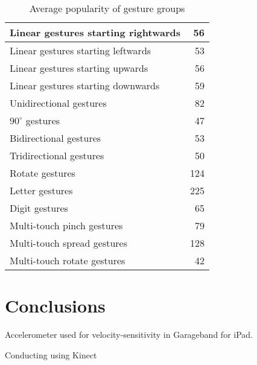 \documentclass{aes130}
\begin{document}
\begin{table} \label{tab:PrelimSurveyAverageGroups}
\begin{center}
\begin{tabular}{|l|r|} \hline

Linear gestures starting rightwards &  56 \\ \hline
Linear gestures starting leftwards  &  53 \\ \hline
Linear gestures starting upwards    &  56 \\ \hline
Linear gestures starting downwards  &  59 \\ \hline \hline

Unidirectional gestures             &  82 \\ \hline
$90^\circ$ gestures                 &  47 \\ \hline
Bidirectional gestures              &  53 \\ \hline
Tridirectional gestures             &  50 \\ \hline \hline

Rotate gestures                     & 124 \\ \hline \hline

Letter gestures                     & 225 \\ \hline
Digit gestures                      &  65 \\ \hline \hline

Multi-touch pinch gestures          &  79 \\ \hline
Multi-touch spread gestures         & 128 \\ \hline
Multi-touch rotate gestures         &  42 \\ \hline

\end{tabular}
\end{center}
\caption{Average popularity of gesture groups}
\end{table}








\section{Conclusions} \label{sec:Conclusions}



Accelerometer used for velocity-sensitivity in Garageband for iPad\cite{GaragebandIpadDemo}.

Conducting using Kinect\cite{KinectConductingGameIdea}



\end{document}
